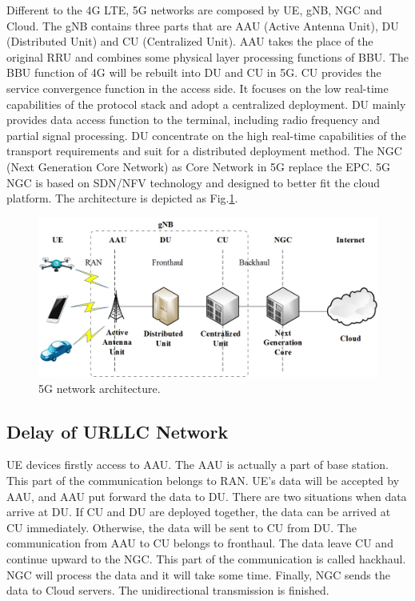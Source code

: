 \documentclass[runningheads]{llncs}
\begin{document}
Different to the 4G LTE, 5G networks are composed by UE, gNB, NGC and Cloud.
The gNB contains three parts that are AAU (Active Antenna Unit), DU (Distributed Unit) and CU (Centralized Unit).
AAU takes the place of the original RRU and combines some physical layer processing functions of BBU.
The BBU function of 4G will be rebuilt into DU and CU in 5G.
CU provides the service convergence function in the access side. It focuses on the low real-time capabilities of the protocol stack and adopt a centralized deployment.
DU mainly provides data access function to the terminal, including radio frequency and partial signal processing. DU concentrate on the high real-time capabilities of the transport requirements and suit for a distributed deployment method.
The NGC (Next Generation Core Network) as Core Network in 5G replace the EPC. 5G NGC is based on SDN/NFV technology and designed to better fit the cloud platform.
The architecture is depicted as Fig.\ref{fig_architecture}.
\begin{figure}[htbp]
\centering
\includegraphics[width=\textwidth]{5G_delay_en.jpg}
\caption{5G network architecture.}
\label{fig_architecture}
\end{figure}

\subsection{Delay of URLLC Network}
UE devices firstly access to AAU. The AAU is actually a part of base station. This part of the communication belongs to RAN.
UE's data will be accepted by AAU, and AAU put forward the data to DU.
There are two situations when data arrive at DU.
If CU and DU are deployed together, the data can be arrived at CU immediately. Otherwise, the data will be sent to CU from DU.
The communication from AAU to CU belongs to fronthaul.
The data leave CU and continue upward to the NGC. This part of the communication is called hackhaul.
NGC will process the data and it will take some time.
Finally, NGC sends the data to Cloud servers. The unidirectional transmission is finished.
\end{document}
